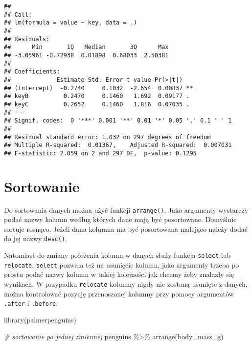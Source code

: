 \documentclass[
]{book}
\newenvironment{Shaded}{\begin{snugshade}}{\end{snugshade}}
\newcommand{\CommentTok}[1]{\textcolor[rgb]{0.56,0.35,0.01}{\textit{#1}}}
\newcommand{\FunctionTok}[1]{\textcolor[rgb]{0.00,0.00,0.00}{#1}}
\newcommand{\NormalTok}[1]{#1}
\newcommand{\SpecialCharTok}[1]{\textcolor[rgb]{0.00,0.00,0.00}{#1}}
\begin{document}
\begin{verbatim}
## 
## Call:
## lm(formula = value ~ key, data = .)
## 
## Residuals:
##      Min       1Q   Median       3Q      Max 
## -3.05961 -0.72938  0.01898  0.68033  2.50381 
## 
## Coefficients:
##             Estimate Std. Error t value Pr(>|t|)   
## (Intercept)  -0.2740     0.1032  -2.654  0.00837 **
## keyB          0.2470     0.1460   1.692  0.09177 . 
## keyC          0.2652     0.1460   1.816  0.07035 . 
## ---
## Signif. codes:  0 '***' 0.001 '**' 0.01 '*' 0.05 '.' 0.1 ' ' 1
## 
## Residual standard error: 1.032 on 297 degrees of freedom
## Multiple R-squared:  0.01367,    Adjusted R-squared:  0.007031 
## F-statistic: 2.059 on 2 and 297 DF,  p-value: 0.1295
\end{verbatim}

\hypertarget{sortowanie}{%
\section{Sortowanie}\label{sortowanie}}

Do sortowania danych można użyć funkcji \texttt{arrange()}. Jako argumenty wystarczy podać nazwy kolumn według których dane mają być posortowane. Domyślnie sortuje rosnąco. Jeżeli dana kolumna ma być posortowana malejąco należy dodać do jej nazwy \texttt{desc()}.

Natomiast do zmiany położenia kolumn w danych służy funkcja \texttt{select} lub \texttt{relocate}. \texttt{select} pozwala też na usunięcie kolumn, jako argumenty trzeba po prostu podać nazwy kolumn w takiej kolejności jak chcemy żeby znalazły się wynikach. W przypadku \texttt{relocate} kolumny nigdy nie zostaną usunięte z danych, można kontrolować pozycję przenoszonej kolumny przy pomocy argumentów \texttt{.after} i \texttt{.before}.

\begin{Shaded}
\begin{Highlighting}[]
\FunctionTok{library}\NormalTok{(palmerpenguins)}

\CommentTok{\# sortowanie po jednej zmiennej}
\NormalTok{penguins }\SpecialCharTok{\%\textgreater{}\%} \FunctionTok{arrange}\NormalTok{(body\_mass\_g)}
\end{Highlighting}
\end{Shaded}
\end{document}
